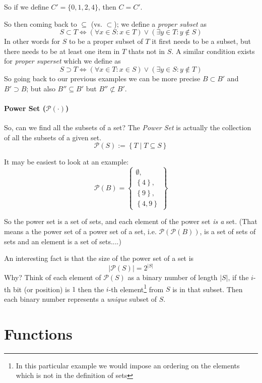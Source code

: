 So if we define $C' = \{0,1,2,4\}$, then $C=C'$.

So then coming back to $\subseteq$ (vs. $\subset$); 
we define a \emph{proper subset} as
\[
S \subset T \iff \left(\forall x \in S : x \in T\right) \vee \left(\exists y \in T : y \notin S\right)
\]
In other words for $S$ to be a proper subset of $T$ it first needs to be a subset, but there needs to be at least one item in $T$ thats not in $S$.
A similar condition exists for \emph{proper superset} which we define as 
\[
S \supset T \iff \left(\forall x \in T : x \in S\right) \vee \left(\exists y \in S : y \notin T\right)
\]
So going back to our previous examples we can be  more precise $B \subset B'$ and $B' \supset B$;
but also $B'' \subseteq B'$ but $B'' \not\subset B'$.

\paragraph{Power Set ($\mathcal{P}(\cdot)$)}

So, can we find all the subsets of a set?  
The \emph{Power Set} is actually the collection of all the subsets of a given set. 
\[
\mathcal{P}(S) := \left\{T \mid T \subseteq S\right\}
\]

It may be easiest to look at an example: 
\[
\mathcal{P}\left(B\right) = \left\{ \begin{matrix}\emptyset, \\ \left\{4\right\}, \\ \left\{9\right\}, \\\left\{4,9\right\}\end{matrix} \right\}
\]

So the power set is a set of sets, and each element of the power set \textit{is a} set.
(That means a the power set of a power set of a set, i.e. $\mathcal{P}\left(\mathcal{P}\left(B\right)\right)$, is a set of sets of sets and an element is a set of sets....) 

An interesting fact is that the size of the power set of a set is 
\[
\left|\mathcal{P}\left(S\right)\right| = 2^{|S|}
\]
Why? Think of each element of $\mathcal{P}\left(S\right)$ as a binary number of length $|S|$, 
if the $i$-th bit (or position) is $1$ then the $i$-th element\footnote{In this particular example we would impose an ordering on the elements which is not in the definition of sets} from $S$ is in that subset. 
Then each binary number represents a \textit{unique} subset of $S$. 

\section{Functions}


